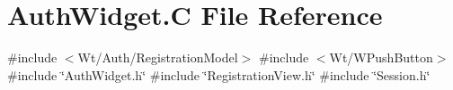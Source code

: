 \hypertarget{_auth_widget_8_c}{}\section{Auth\+Widget.\+C File Reference}
\label{_auth_widget_8_c}
{\ttfamily \#include $<$Wt/\+Auth/\+Registration\+Model$>$}\newline
{\ttfamily \#include $<$Wt/\+W\+Push\+Button$>$}\newline
{\ttfamily \#include \char`\"{}Auth\+Widget.\+h\char`\"{}}\newline
{\ttfamily \#include \char`\"{}Registration\+View.\+h\char`\"{}}\newline
{\ttfamily \#include \char`\"{}Session.\+h\char`\"{}}\newline
